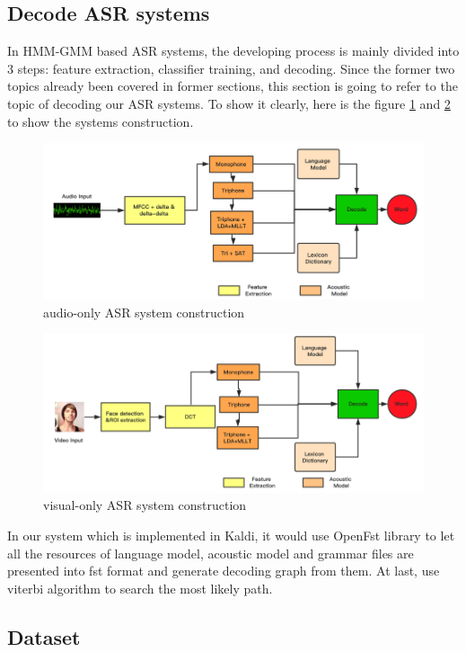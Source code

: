 \subsection{Decode ASR systems}
In HMM-GMM based ASR systems, the developing process is mainly divided into 3 steps: feature extraction, classifier training, and decoding. Since the former two topics already been covered in former sections, this section is going to refer to the topic of decoding our ASR systems.
To show it clearly, here is the figure \ref{fig:aasr} and \ref{fig:vasr} to show the systems construction.
\begin{figure}[ht]
\centering
\includegraphics[width=1\linewidth]{figures/aasr.png}
\caption{audio-only ASR system construction}
\label{fig:aasr}
\end{figure}
\begin{figure}[ht]
\centering
\includegraphics[width=1\linewidth]{figures/vasr.png}
\caption{visual-only ASR system construction}
\label{fig:vasr}
\end{figure}

In our system which is implemented in Kaldi, it would use OpenFst library to let all the resources of language model, acoustic model and grammar files are presented into fst format and generate decoding graph from them. At last, use viterbi algorithm to search the most likely path. 

\subsection{Dataset}
